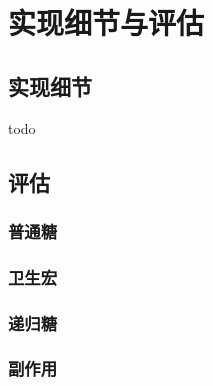 \pagestyle{fancy}
\normalsize
\linespread{1.5}\selectfont
\chapter{实现细节与评估}

\section{实现细节}
todo

\section{评估}

\subsection{普通糖}

\subsection{卫生宏}

\subsection{递归糖}

\subsection{副作用}